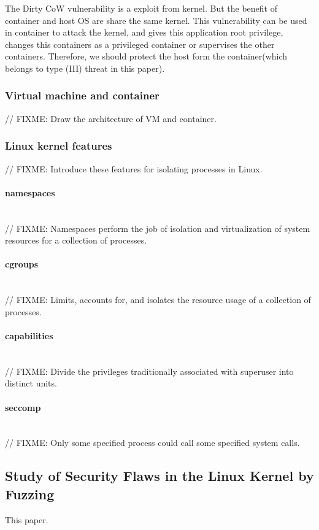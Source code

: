 \documentclass[12pt,a4paper,oneside]{IEEEconf}
\begin{document}
The Dirty CoW vulnerability is a exploit from kernel. But the benefit
of container and host OS are share the same kernel. This vulnerability can be used in
container to attack the kernel, and gives this application root privilege, changes this
containers as a privileged container or supervises the other containers. Therefore, we should
protect the host form the container(which belongs to type (\RN{3}) threat in this paper).

\subsubsection{Virtual machine and container}
// FIXME: Draw the architecture of VM and container.

\subsubsection{Linux kernel features}
// FIXME: Introduce these features for isolating processes in Linux.

\paragraph{namespaces}\mbox{}\\
// FIXME: Namespaces perform the job of isolation and virtualization of system resources
for a collection of processes.\cite{Road_Ahead}

\paragraph{cgroups}\mbox{}\\
// FIXME: Limits, accounts for, and isolates the resource usage of a collection of processes.
\cite{cgroup_wiki}

\paragraph{capabilities}\mbox{}\\
// FIXME: Divide the privileges traditionally associated with superuser into distinct
units.

\paragraph{seccomp}\mbox{}\\
// FIXME: Only some specified process could call some specified system calls.

\subsection{Study of Security Flaws in the Linux Kernel by Fuzzing}
This paper\cite{Fuzzing}.
\end{document}
